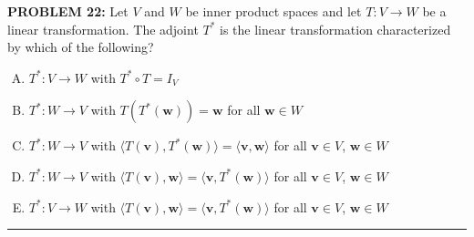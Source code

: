 \documentclass[12pt]{amsart}
\newcommand{\divider}{
  \vspace{-1em} %
  \noindent
  \raisebox{-0.15ex}{\textbullet}%
  \hspace{0.5em}%
  \rule[0.5ex]{0.95\textwidth}{1.0pt}%
  \hspace{0.5em}%
  \raisebox{-0.15ex}{\textbullet}%
  \vspace{0em} %
}
\begin{document}
{\bf PROBLEM 22:}
%
Let $V$ and $W$ be inner product spaces and let $T : V \to W$ be a linear
transformation.  The adjoint $T^*$ is the linear transformation
characterized by which of the following?
%
\begin{enumerate}[(A)]
\item $T^* : V \to W$ with $T^* \circ T = I_V$
\item $T^* : W \to V$ with $T(T^*(\mathbf{w})) = \mathbf{w}$ for all $\mathbf{w} \in W$
\item $T^* : W \to V$ with $\langle T(\mathbf{v}), T^*(\mathbf{w}) \rangle = \langle \mathbf{v}, \mathbf{w} \rangle$ for all $\mathbf{v} \in V$, $\mathbf{w} \in W$
\item $T^* : W \to V$ with $\langle T(\mathbf{v}), \mathbf{w} \rangle = \langle \mathbf{v}, T^*(\mathbf{w}) \rangle$ for all $\mathbf{v} \in V$, $\mathbf{w} \in W$
\item $T^* : V \to W$ with $\langle T(\mathbf{v}), \mathbf{w} \rangle = \langle \mathbf{v}, T^*(\mathbf{w}) \rangle$ for all $\mathbf{v} \in V$, $\mathbf{w} \in W$
\end{enumerate}
%
%
%
%
%
\divider
\end{document}
